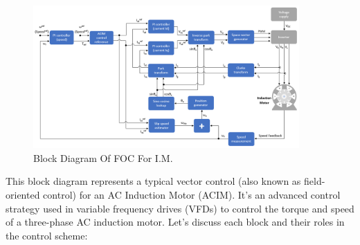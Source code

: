 \begin{figure}
\centering
\includegraphics[width=4in]{sections/section2/images/blockDiagram.png}
\caption{Block Diagram Of FOC For I.M.}
\label{fig:FOCblock}
\end{figure}



This block diagram represents a typical vector control (also known as field-oriented control) for an AC Induction Motor (ACIM). It's an advanced control strategy used in variable frequency drives (VFDs) to control the torque and speed of a three-phase AC induction motor. Let's discuss each block and their roles in the control scheme:

